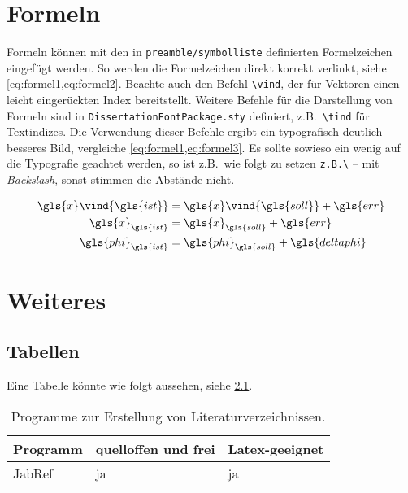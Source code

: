 
\chapter{Formeln} \label{sec:Formeln}

Formeln können mit den in \texttt{preamble/symbolliste} definierten Formelzeichen eingefügt werden. So werden die Formelzeichen direkt korrekt verlinkt, siehe \cref{eq:formel1,eq:formel2}. Beachte auch den Befehl \texttt{\textbackslash vind}, der für Vektoren einen leicht eingerückten Index bereitstellt. Weitere Befehle für die Darstellung von Formeln sind in \texttt{DissertationFontPackage.sty} definiert, z.B.\ \texttt{\textbackslash tind} für Textindizes. Die Verwendung dieser Befehle ergibt ein typografisch deutlich besseres Bild, vergleiche \cref{eq:formel1,eq:formel3}. Es sollte sowieso ein wenig auf die Typografie geachtet werden, so ist z.B.\ wie folgt zu setzen \texttt{z.B.\textbackslash} -- mit \textit{Backslash}, sonst stimmen die Abstände nicht.

\begin{align}
\label{eq:formel1}
\gls{x}\vind{\gls{ist}} &= \gls{x}\vind{\gls{soll}} + \gls{err} \\
\label{eq:formel3}
\gls{x}_{\gls{ist}} &= \gls{x}_{\gls{soll}} + \gls{err} \\
\label{eq:formel2}
\gls{phi}_{\gls{ist}} &= \gls{phi}_{\gls{soll}} + \gls{deltaphi}
\end{align}


\chapter{Weiteres}

\section{Tabellen}
\label{sec:HFS_Wahrnehmung}

Eine Tabelle könnte wie folgt aussehen, siehe \cref{tab:programme}.

\begin{table}[hbt]
	\centering
	\caption{Programme zur Erstellung von Literaturverzeichnissen.}
	\label{tab:programme}
	\begin{tabular}{lll}
		\toprule
		Programm            & quelloffen und frei &  Latex-geeignet                 \\ \midrule
		JabRef              &     ja              &    ja    \\ \bottomrule
	\end{tabular}
\end{table}


